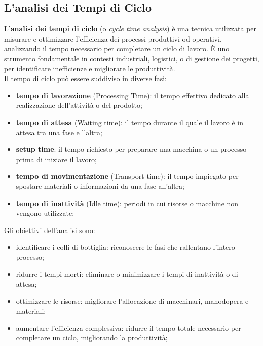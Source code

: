 \subsection{L'analisi dei Tempi di Ciclo}\label{sub:bpr_l_analisi_dei_tempi_di_ciclo} %
L'\textbf{analisi dei tempi di ciclo} (o \textit{cycle time analysis}) è una tecnica utilizzata per misurare e ottimizzare l'efficienza dei processi produttivi od operativi, analizzando il tempo necessario per completare un ciclo di lavoro.
È uno strumento fondamentale in contesti industriali, logistici, o di gestione dei progetti, per identificare inefficienze e migliorare le produttività.
\\
Il tempo di ciclo può essere suddiviso in diverse fasi:
\begin{itemize}
    \item \textbf{tempo di lavorazione} (Processing Time): il tempo effettivo dedicato alla realizzazione dell'attività o del prodotto;
    \item \textbf{tempo di attesa} (Waiting time): il tempo durante il quale il lavoro è in attesa tra una fase e l'altra;
    \item \textbf{setup time}: il tempo richiesto per preparare una macchina o un processo prima di iniziare il lavoro;
    \item \textbf{tempo di movimentazione} (Transport time): il tempo impiegato per spostare materiali o informazioni da una fase all'altra;
    \item \textbf{tempo di inattività} (Idle time): periodi in cui risorse o macchine non vengono utilizzate;
\end{itemize}
\begin{note}[Obiettivi]
    Gli obiettivi dell'analisi sono:
    \begin{itemize}
        \item identificare i colli di bottiglia: riconoscere le fasi che rallentano l'intero processo;
        \item ridurre i tempi morti: eliminare o minimizzare i tempi di inattività o di attesa;
        \item ottimizzare le risorse: migliorare l'allocazione di macchinari, manodopera e materiali;
        \item aumentare l'efficienza complessiva: ridurre il tempo totale necessario per completare un ciclo, migliorando la produttività;
    \end{itemize}
\end{note}
%
